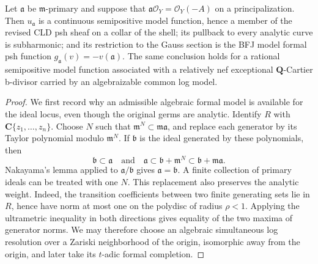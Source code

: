 \begin{lemma}\label{lem:frontier-local-ma-common-model-core}
Let \(\mathfrak a\) be \(\mathfrak m\)-primary and suppose that
\(\mathfrak a\mathcal O_Y=\mathcal O_Y(-A)\) on a principalization.  Then
\(u_{\mathfrak a}\) is a continuous semipositive model function, hence a
member of the revised CLD psh sheaf on a collar of the shell; its pullback to
every analytic curve is subharmonic; and its restriction to the Gauss
section is the BFJ model formal psh function
\(g_{\mathfrak a}(v)=-v(\mathfrak a)\).  The same conclusion holds for a
rational semipositive model function associated with a relatively nef
exceptional \(\mathbf Q\)-Cartier b-divisor carried by an algebraizable
common log model.
\end{lemma}

\begin{proof}
We first record why an admissible algebraic formal model is available for
the ideal locus, even though the original germs are analytic.  Identify
\(R\) with \(\mathbf C\{z_1,\ldots,z_n\}\).  Choose \(N\) such that
\(\mathfrak m^N\subset\mathfrak m\mathfrak a\), and replace each generator
by its Taylor polynomial modulo \(\mathfrak m^N\).  If \(\mathfrak b\) is
the ideal generated by these polynomials, then
\[
 \mathfrak b\subset\mathfrak a
 \quad\text{and}\quad
 \mathfrak a\subset\mathfrak b+\mathfrak m^N
                 \subset\mathfrak b+\mathfrak m\mathfrak a.
\]
Nakayama's lemma applied to \(\mathfrak a/\mathfrak b\) gives
\(\mathfrak a=\mathfrak b\).  A finite collection of primary ideals can be
treated with one \(N\).  This replacement also preserves the analytic
weight.  Indeed, the transition coefficients between two finite generating
sets lie in \(R\), hence have norm at most one on the polydisc of radius
\(\rho<1\).  Applying the ultrametric inequality in both directions gives
equality of the two maxima of generator norms.  We may therefore choose an
algebraic simultaneous log resolution over a Zariski neighborhood of the
origin, isomorphic away from the origin, and later take its \(t\)-adic formal
completion.


\end{proof}
